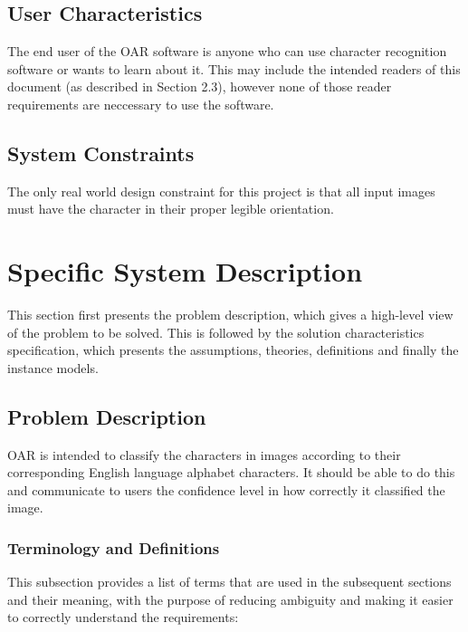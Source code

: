 \documentclass[12pt]{article}
\begin{document}
\subsection{User Characteristics} \label{SecUserCharacteristics}

The end user of the OAR software is anyone who can use character recognition software or wants to learn about it. This may include 
the intended readers of this document (as described in Section 2.3), however none of those reader requirements are neccessary 
to use the software.

\subsection{System Constraints}

The only real world design constraint for this project is that all input images must have the character in their proper legible
orientation.

\section{Specific System Description}

This section first presents the problem description, which gives a high-level
view of the problem to be solved.  This is followed by the solution characteristics
specification, which presents the assumptions, theories, definitions and finally
the instance models.  

\subsection{Problem Description} \label{Sec_pd}

OAR is intended to classify the characters in images according to their corresponding English language
alphabet characters. It should be able to do this and communicate to users the confidence level in how correctly it 
classified the image.

\subsubsection{Terminology and  Definitions}

This subsection provides a list of terms that are used in the subsequent
sections and their meaning, with the purpose of reducing ambiguity and making it
easier to correctly understand the requirements:
\end{document}

